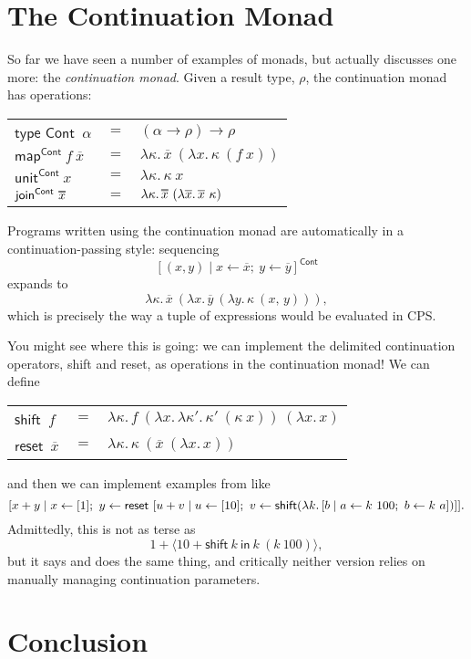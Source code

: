 \documentclass[acmsmall, nonacm, screen]{acmart}
\newcommand\doverline[1]{%
  \setbox0=\hbox{$\overline{#1}$}%
  \ht0=\dimexpr\ht0-.30ex\relax%
  \overline{\copy0}%
}
\newcommand{\shift}[2]{\textsf{shift}~#1~\textsf{in}~#2}
\newcommand{\reset}[1]{\langle #1 \rangle}
\newcommand{\lambdaE}[2]{\lambda #1.\, #2}
\newcommand{\map}[3]{\textsf{map}^{\textsf{#1}}~#2~#3}
\newcommand{\unit}[2]{\textsf{unit}^{\textsf{#1}}~#2}
\newcommand{\join}[2]{\textsf{join}^{\textsf{#1}}~#2}
\begin{document}
\section{The Continuation Monad} \label{sec:contmonad}
So far we have seen a number of examples of monads, but \citeauthor{wadler1990comprehending}
actually discusses one more: the {\em continuation monad}. Given a result type, $\rho$, the
continuation monad has operations:
\begin{center}
  \begin{tabular}{lll}
    $\textsf{type Cont}$~$\alpha$ & $=$ & $(\alpha \to \rho) \to \rho$ \\
    $\map{Cont}{f}{\overline{x}}$ & $=$ & $\lambdaE{\kappa}{\overline{x}~(\lambdaE{x}{\kappa~(f~x)})}$ \\
    $\unit{Cont}{x}$ & $=$ & $\lambdaE{\kappa}{\kappa~x}$ \\
    $\join{Cont}{\doverline{x}}$ & $=$ &
      $\lambdaE{\kappa}{\doverline{x}~(\lambdaE{\overline{x}}{\overline{x}~\kappa})}$
  \end{tabular}
\end{center}
Programs written using the continuation monad are automatically in a continuation-passing style:
sequencing
\[ [(x, y) \mid x \leftarrow \overline{x};\ y \leftarrow \overline{y}]^{\textsf{Cont}} \]
expands to
\[ \lambdaE{\kappa}{\overline{x}~(\lambdaE{x}{\overline{y}~(\lambdaE{y}{\kappa~(x,\, y)})})}, \]
which is precisely the way a tuple of expressions would be evaluated in CPS.

You might see where this is going: we can implement the delimited continuation operators, shift and
reset, as operations in the continuation monad! We can define
\begin{center}
  \begin{tabular}{lll}
    $\textsf{shift}$~$f$ & $=$ & $\lambdaE{\kappa}{f~(\lambdaE{x}{\lambdaE{\kappa'}{\kappa'~(\kappa~x)}})~(\lambdaE{x}{x})}$ \\
    $\textsf{reset}$~$\overline{x}$ & $=$ & $\lambdaE{\kappa}{\kappa~(\overline{x}~(\lambdaE{x}{x}))}$
  \end{tabular}
\end{center}
and then we can implement examples from \citeauthor{danvy1989functional} like
\[
  [x + y \mid x \leftarrow [1];\ y \leftarrow \textsf{reset}~[u + v \mid u \leftarrow [10];\ v \leftarrow \textsf{shift}(\lambdaE{k}{[b \mid a \leftarrow k~100;\ b \leftarrow k~a]})]]. \\
\]
Admittedly, this is not as terse as
\[ 1 + \reset{10 + \shift{k}{k~(k~100)}}, \]
but it says and does the same thing, and critically neither version relies on manually managing
continuation parameters.

\section{Conclusion} \label{sec:conclusion}

\begin{acks}
\end{acks}



\end{document}
